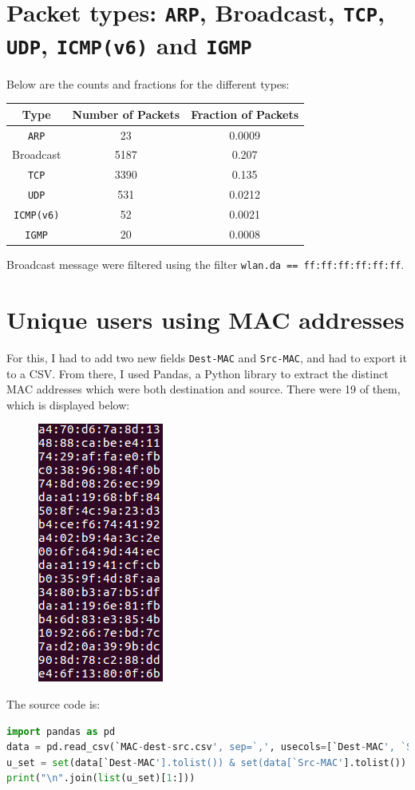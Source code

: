 \documentclass{article}
\begin{document}
\section{Packet types: \texttt{ARP}, Broadcast, \texttt{TCP}, \texttt{UDP}, \texttt{ICMP(v6)} and \texttt{IGMP}}
\begin{flushleft}
Below are the counts and fractions for the different types:
\begin{center}
\begin{tabular}{|c|c|c|}
\hline
Type & Number of Packets & Fraction of Packets \\
\hline
\hline
\texttt{ARP} & 23 & 0.0009 \\
\hline
Broadcast & 5187 & 0.207 \\
\hline
\texttt{TCP} & 3390 & 0.135 \\
\hline
\texttt{UDP} & 531 & 0.0212 \\
\hline
\texttt{ICMP(v6)} & 52 & 0.0021 \\
\hline
\texttt{IGMP} & 20 & 0.0008 \\
\hline
\end{tabular}
\end{center}
Broadcast message were filtered using the filter \texttt{wlan.da == ff:ff:ff:ff:ff:ff}.
\end{flushleft}

\section{Unique users using MAC addresses}
\begin{flushleft}
For this, I had to add two new fields \texttt{Dest-MAC} and \texttt{Src-MAC}, and had to export it to a CSV. From there, I used Pandas, a Python library to extract the distinct MAC addresses which were both destination and source. There were 19 of them, which is displayed below:
\begin{figure}[H]
\centering
\includegraphics[width=0.25\linewidth]{users-mac.png}
\end{figure}
The source code is:
\begin{lstlisting}[basicstyle=\footnotesize\ttfamily, showstringspaces=false, language=Python]
import pandas as pd
data = pd.read_csv(`MAC-dest-src.csv', sep=`,', usecols=[`Dest-MAC', `Src-MAC'])
u_set = set(data[`Dest-MAC'].tolist()) & set(data[`Src-MAC'].tolist())
print("\n".join(list(u_set)[1:]))
\end{lstlisting}
\end{flushleft}
\end{document}
